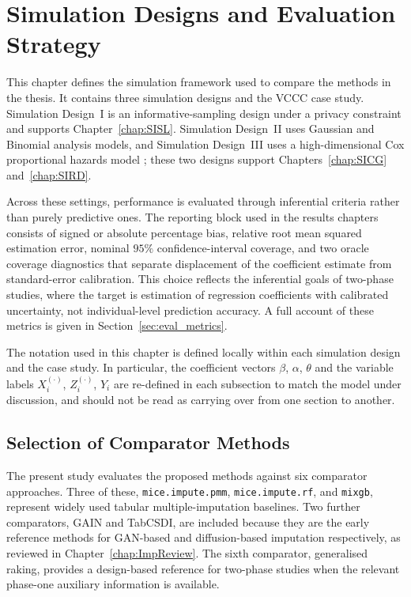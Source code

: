 \chapter{Simulation Designs and Evaluation Strategy}
\label{chap:SimDesigns}
This chapter defines the simulation framework used to compare the methods in the thesis. It contains three simulation designs and the VCCC case study. Simulation Design~I is an informative-sampling design under a privacy constraint and supports Chapter~\ref{chap:SISL}. Simulation Design~II uses Gaussian and Binomial analysis models, and Simulation Design~III uses a high-dimensional Cox proportional hazards model \citep{therneau2000cox}; these two designs support Chapters~\ref{chap:SICG} and~\ref{chap:SIRD}.

Across these settings, performance is evaluated through inferential criteria rather than purely predictive ones. The reporting block used in the results chapters consists of signed or absolute percentage bias, relative root mean squared estimation error, nominal $95\%$ confidence-interval coverage, and two oracle coverage diagnostics that separate displacement of the coefficient estimate from standard-error calibration. This choice reflects the inferential goals of two-phase studies, where the target is estimation of regression coefficients with calibrated uncertainty, not individual-level prediction accuracy. A full account of these metrics is given in Section~\ref{sec:eval_metrics}.

The notation used in this chapter is defined locally within each simulation design and the case study. In particular, the coefficient vectors $\beta$, $\alpha$, $\theta$ and the variable labels $X_i^{(\cdot)}$, $Z_i^{(\cdot)}$, $Y_i$ are re-defined in each subsection to match the model under discussion, and should not be read as carrying over from one section to another.

\section{Selection of Comparator Methods}
\label{sec:comparators}
The present study evaluates the proposed methods against six comparator approaches. Three of these, \texttt{mice.impute.pmm}, \texttt{mice.impute.rf}, and \texttt{mixgb}, represent widely used tabular multiple-imputation baselines. Two further comparators, GAIN and TabCSDI, are included because they are the early reference methods for GAN-based and diffusion-based imputation respectively, as reviewed in Chapter~\ref{chap:ImpReview}. The sixth comparator, generalised raking, provides a design-based reference for two-phase studies when the relevant phase-one auxiliary information is available.

